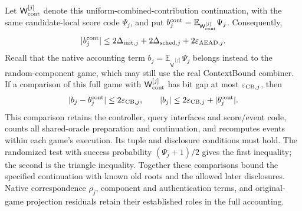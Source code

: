 Let $\mathsf W_{\rm cont}^{[j]}$ denote this uniform-combined-contribution
continuation, with the same candidate-local score code $\Psi_j$, and put
$b_j^{\rm cont}=\mathbb E_{\mathsf W_{\rm cont}^{[j]}}\Psi_j$.
Consequently,
\[
 |b_j^{\rm cont}|\le
 2\Delta_{{\rm init},j}
 +2\Delta_{{\rm sched},j}
 +2\varepsilon_{{\rm AEAD},j}.
\]
Recall that the native accounting term
$b_j=\mathbb E_{\widetilde{\mathsf V}^{[j]}}\Psi_j$ belongs instead to
the random-component game, which may still use the real ContextBound
combiner. If a comparison of this full game with
$\mathsf W_{\rm cont}^{[j]}$ has bit gap at most
$\varepsilon_{{\rm CB},j}$, then
\[
 |b_j-b_j^{\rm cont}|\le2\varepsilon_{{\rm CB},j},
 \qquad
 |b_j|\le2\varepsilon_{{\rm CB},j}+|b_j^{\rm cont}|.
\]
This comparison retains the controller, query interfaces and score/event
code, counts all shared-oracle preparation and continuation, and recomputes
events within each game's execution. Its tuple and disclosure conditions
must hold. The randomized test with success probability
$(\Psi_j+1)/2$ gives the first inequality; the second is the triangle
inequality. Together these comparisons bound the specified continuation
with known old roots and the allowed later disclosures. Native
correspondence $\rho_j$, component and authentication terms, and
original-game projection residuals retain their established roles in
the full accounting.
